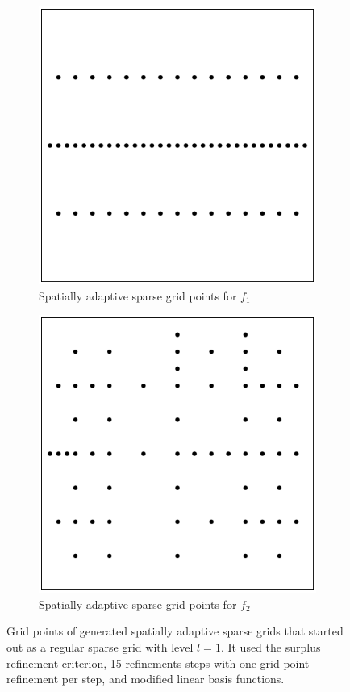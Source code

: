 \documentclass[
  a4paper,  %
  twoside,  %
  bibliography=totoc,
  headsepline,
  cleardoublepage=empty,
  parskip=half,
  draft=false
]{scrbook}
\begin{document}
\begin{figure}[H]
\begin{subfigure}{.5\textwidth}
  \centering
  \includegraphics[width=.8\linewidth]{graphics/grid_f1}
  \caption{Spatially adaptive sparse grid points for $f_1$}
  \label{fig:as_rn}
\end{subfigure}%
\begin{subfigure}{.5\textwidth}
  \centering
  \includegraphics[width=.8\linewidth]{graphics/grid_f2}
  \caption{Spatially adaptive sparse grid points for $f_2$}
  \label{fig:as_nn}
\end{subfigure}
\caption{Grid points of generated spatially adaptive sparse grids that started out as a regular sparse grid with level $l=1$. It used the surplus refinement criterion, 15 refinements steps with one grid point refinement per step, and modified linear basis functions.}
\label{fig:grids}
\end{figure}
\end{document}
